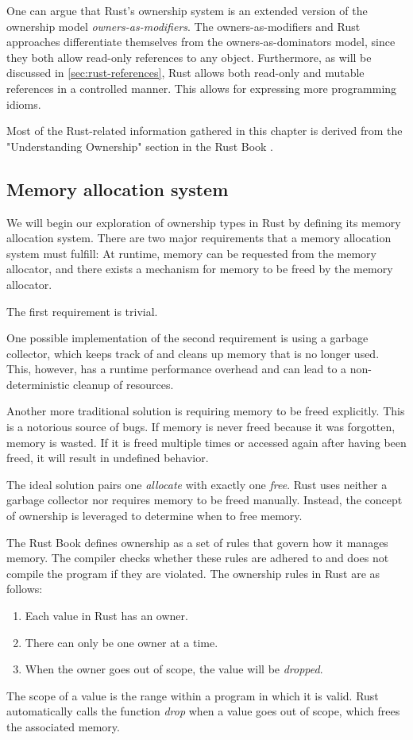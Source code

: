 \documentclass[sigplan,11pt,nonacm]{acmart}
\begin{document}
One can argue that Rust's ownership system is an extended version of the ownership model \emph{owners-as-modifiers}.
The owners-as-modifiers and Rust approaches differentiate themselves from the owners-as-dominators model, since they both allow read-only references to any object.
Furthermore, as will be discussed in \ref{sec:rust-references}, Rust allows both read-only and mutable references in a controlled manner.
This allows for expressing more programming idioms.

Most of the Rust-related information gathered in this chapter is derived from the "Understanding Ownership" section in the Rust Book \cite{rust-book}.


\subsection{Memory allocation system}
\label{sec:memory-allocation}

We will begin our exploration of ownership types in Rust by defining its memory allocation system.
There are two major requirements that a memory allocation system must fulfill:
At runtime, memory can be requested from the memory allocator, and there exists a mechanism for memory to be freed by the memory allocator.

The first requirement is trivial.

One possible implementation of the second requirement is using a garbage collector, which keeps track of and cleans up memory that is no longer used.
This, however, has a runtime performance overhead and can lead to a non-deterministic cleanup of resources. \cite{understanding-evolving-rust}

Another more traditional solution is requiring memory to be freed explicitly.
This is a notorious source of bugs.
If memory is never freed because it was forgotten, memory is wasted.
If it is freed multiple times or accessed again after having been freed, it will result in undefined behavior.

The ideal solution pairs one \emph{allocate} with exactly one \emph{free}.
Rust uses neither a garbage collector nor requires memory to be freed manually.
Instead, the concept of ownership is leveraged to determine when to free memory.

The Rust Book \cite{rust-book} defines ownership as a set of rules that govern how it manages memory.
The compiler checks whether these rules are adhered to and does not compile the program if they are violated.
The ownership rules in Rust are as follows:
\begin{enumerate}
  \item Each value in Rust has an owner.
  \item There can only be one owner at a time.
  \item When the owner goes out of scope, the value will be \emph{dropped}.
\end{enumerate}
The scope of a value is the range within a program in which it is valid.
Rust automatically calls the function \emph{drop} when a value goes out of scope, which frees the associated memory.
\end{document}
